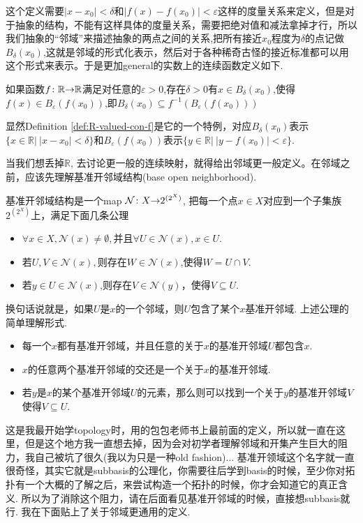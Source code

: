 这个定义需要$|x-x_0| < \delta$和$|f(x)-f(x_0)| < \varepsilon$这样的度量关系来定义，但是对于抽象的结构，不能有这样具体的度量关系，需要把绝对值和减法拿掉才行，所以我们抽象的“邻域”来描述抽象的两点之间的关系,把所有接近$x_0$程度为$\delta$的点记做$B_{\delta}(x_0)$,这就是邻域的形式化表示，然后对于各种稀奇古怪的接近标准都可以用这个形式来表示。于是更加general的实数上的连续函数定义如下.
\begin{definition}
如果函数${f}\colon{\mathbb{R}}{\to}{\mathbb{R}}$满足对任意的$\varepsilon > 0$,存在$\delta > 0$有$x \in B_{\delta}(x_0)$,使得$f(x) \in B_{\varepsilon}(f(x_0))$,即$B_{\delta}(x_0) \subseteq f^{-1}(B_{\varepsilon}(f(x_0)))$
\end{definition}
显然Definition \ref{def:R-valued-con-f}是它的一个特例，对应$B_{\delta}(x_0)$表示$\{x \in \mathbb{R} |\ |x-x_0| < \delta \}$和$B_{\varepsilon}(f(x_0))$表示$\{y \in \mathbb{R} |\ |y-f(x_0)| < \varepsilon \}$.

当我们想丢掉$\mathbb{R}$, 去讨论更一般的连续映射，就得给出邻域更一般定义。在邻域之前，应该先理解基准开邻域结构(base open neighborhood).
\begin{definition}[subbasis]
基准开邻域结构是一个map ${\mathcal{N}}\colon{X}{\to}{2^{(2^X)}}$, 把每一个点$x \in X$对应到一个子集族$2^{(2^X)}$上，满足下面几条公理
		\begin{itemize}
			\item $\forall x \in X,\mathcal{N}(x) \neq \emptyset,$并且$\forall U \in \mathcal{N}(x),x \in U$.
			\item 若$U,V \in \mathcal{N}(x),$则存在$W \in \mathcal{N}(x)$,使得$W = U \cap V$.
			\item 若$y \in U \in \mathcal{N}(x)$,则存在$V \in \mathcal{N}(y)$，使得$V \subseteq U$.
		\end{itemize}
换句话说就是，如果$U$是$x$的一个邻域，则$U$包含了某个$x$基准开邻域. 上述公理的简单理解形式.
\begin{itemize}
	\item 每一个$x$都有基准开邻域，并且任意的关于$x$的基准开邻域$U$都包含$x$.
	\item $x$的任意两个基准开邻域的交还是一个关于$x$的基准开邻域.
	\item 若$y$是$x$的某个基准开邻域$U$的元素，那么则可以找到一个关于$y$的基准开邻域$V$使得$V \subseteq U$.
\end{itemize}
\end{definition}

这是我最开始学topology时，用的包包老师书上最前面的定义，所以就一直在这里，但是这个地方我一直想去掉，因为会对初学者理解邻域和开集产生巨大的阻力，我自己被坑了很久(我以为只是一种old fashion)... 基准开领域这个名字就一直很奇怪，其实它就是subbasis的公理化，你需要往后学到basis的时候，至少你对拓扑有一个大概的了解之后，来尝试构造一个拓扑的时候，你才会知道它的真正含义. 所以为了消除这个阻力，请在后面看见基准开邻域的时候，直接想subbasis就行. 我在下面贴上了关于邻域更通用的定义.

